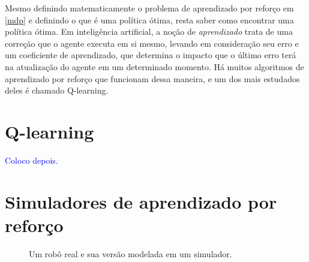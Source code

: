 \documentclass[cic,tc]{iiufrgs}
\newcommand\henrique[1]{\textcolor{blue}{#1}}
\begin{document}
    
    Mesmo definindo matematicamente o problema de aprendizado por reforço em \ref{mdp} e definindo o que é uma política ótima, resta saber como encontrar uma
    política ótima. Em inteligência artificial, a noção de \textit{aprendizado} trata de uma correção que o agente executa em si mesmo, levando em consideração
    seu erro e um coeficiente de aprendizado, que determina o impacto que o último erro terá na atualização do agente em um determinado momento. Há muitos
    algoritmos de aprendizado por reforço que funcionam dessa maneira, e um dos mais estudados deles é chamado Q-learning.
    
    \section{Q-learning}
    \henrique{Coloco depois.}
    \blindtext
    
    
    \section{Simuladores de aprendizado por reforço}
    \begin{figure}[h]
        \caption{Um robô real e sua versão modelada em um simulador.}
        \begin{center}
        \end{center}
        \label{fig:mujocosimulator}
    \end{figure}
    
\end{document}
